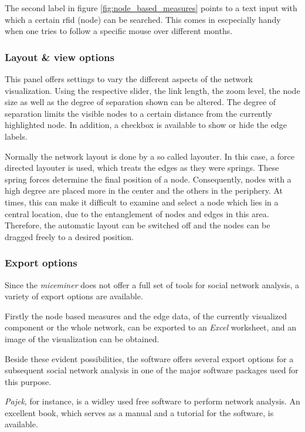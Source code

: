 The second label in figure \ref{fig:node_based_measures} points to a text input with which a certain rfid (node) can be searched. This comes in escpecially handy when one tries to follow a specific mouse over different months.    

\subsubsection*{Layout \& view options}

This panel offers settings to vary the different aspects of the network visualization. Using the respective slider, the link length, the zoom level, the node size as well as the degree of separation shown can be altered. The degree of separation limits the visible nodes to a certain distance from the currently highlighted node. In addition, a checkbox is available to show or hide the edge labels.

Normally the network layout is done by a so called layouter. In this case, a force directed layouter is used, which treats the edges as they were springs. These spring forces determine the final position of a node. Consequently, nodes with a high degree are placed more in the center and the others in the periphery. At times, this can make it difficult to examine and select a node which lies in a central location, due to the entanglement of nodes and edges in this area. Therefore, the automatic layout can be switched off and the nodes can be dragged freely to a desired position.

\subsubsection*{Export options} 
\label{subsubsec:export_options}

Since the \textit{miceminer} does not offer a full set of tools for social network analysis, a variety of export options are available.

Firstly the node based measures and the edge data, of the currently visualized component or the whole network, can be exported to an \textit{Excel} worksheet, and an image of the visualization can be obtained.

Beside these evident possibilities, the software offers several export options for a subsequent social network analysis in one of the major software packages used for this purpose.

\textit{Pajek}\cite{Pajek}, for instance, is a widley used free software to perform network analysis. An excellent book\cite{pajek:03}, which serves as a manual and a tutorial for the software, is available.

